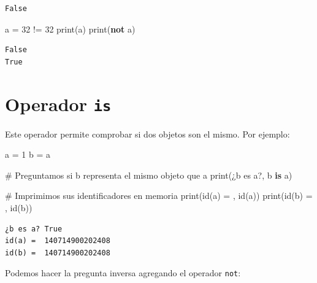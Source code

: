 \documentclass[
  spanish,
  letterpaper,
]{scrbook}
\newenvironment{Shaded}{\begin{snugshade}}{\end{snugshade}}
\newcommand{\BuiltInTok}[1]{\textcolor[rgb]{0.00,0.23,0.31}{#1}}
\newcommand{\CommentTok}[1]{\textcolor[rgb]{0.37,0.37,0.37}{#1}}
\newcommand{\DecValTok}[1]{\textcolor[rgb]{0.68,0.00,0.00}{#1}}
\newcommand{\KeywordTok}[1]{\textcolor[rgb]{0.00,0.23,0.31}{\textbf{#1}}}
\newcommand{\NormalTok}[1]{\textcolor[rgb]{0.00,0.23,0.31}{#1}}
\newcommand{\OperatorTok}[1]{\textcolor[rgb]{0.37,0.37,0.37}{#1}}
\newcommand{\StringTok}[1]{\textcolor[rgb]{0.13,0.47,0.30}{#1}}
\theoremstyle{definition}
\theoremstyle{remark}
\begin{document}
\begin{verbatim}
False
\end{verbatim}

\begin{Shaded}
\begin{Highlighting}[]
\NormalTok{a }\OperatorTok{=} \DecValTok{32} \OperatorTok{!=} \DecValTok{32}
\BuiltInTok{print}\NormalTok{(a)}
\BuiltInTok{print}\NormalTok{(}\KeywordTok{not}\NormalTok{ a)}
\end{Highlighting}
\end{Shaded}

\begin{verbatim}
False
True
\end{verbatim}

\section{\texorpdfstring{Operador
\texttt{is}}{Operador is}}\label{operador-is}

Este operador permite comprobar si dos objetos son el mismo. Por
ejemplo:

\begin{Shaded}
\begin{Highlighting}[]
\NormalTok{a }\OperatorTok{=} \DecValTok{1}
\NormalTok{b }\OperatorTok{=}\NormalTok{ a}

\CommentTok{\# Preguntamos si \textquotesingle{}b\textquotesingle{} representa el mismo objeto que \textquotesingle{}a\textquotesingle{}}
\BuiltInTok{print}\NormalTok{(}\StringTok{\textquotesingle{}¿b es a?\textquotesingle{}}\NormalTok{, b }\KeywordTok{is}\NormalTok{ a)}

\CommentTok{\# Imprimimos sus identificadores en memoria}
\BuiltInTok{print}\NormalTok{(}\StringTok{\textquotesingle{}id(a) = \textquotesingle{}}\NormalTok{, }\BuiltInTok{id}\NormalTok{(a))}
\BuiltInTok{print}\NormalTok{(}\StringTok{\textquotesingle{}id(b) = \textquotesingle{}}\NormalTok{, }\BuiltInTok{id}\NormalTok{(b))}
\end{Highlighting}
\end{Shaded}

\begin{verbatim}
¿b es a? True
id(a) =  140714900202408
id(b) =  140714900202408
\end{verbatim}

Podemos hacer la pregunta inversa agregando el operador \texttt{not}:
\end{document}
